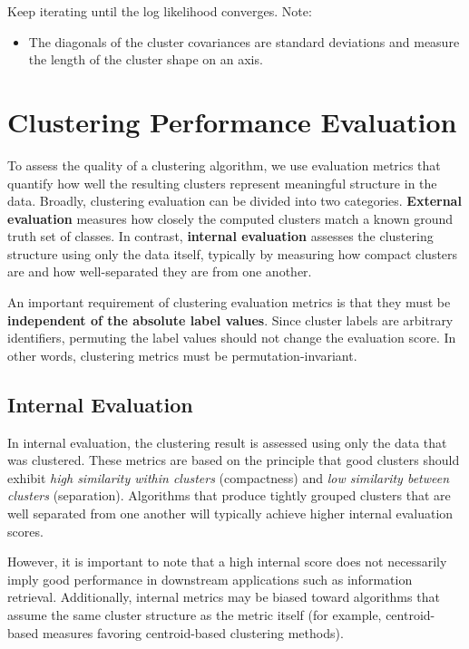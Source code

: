 \documentclass{article}
\begin{document}
Keep iterating until the log likelihood converges. Note:
\begin{itemize}
    \item The diagonals of the cluster covariances are standard deviations and measure the length of the cluster shape on an axis.
\end{itemize}

\section{Clustering Performance Evaluation}

To assess the quality of a clustering algorithm, we use evaluation metrics that quantify how well the resulting clusters represent meaningful structure in the data. Broadly, clustering evaluation can be divided into two categories. \textbf{External evaluation} measures how closely the computed clusters match a known ground truth set of classes. In contrast, \textbf{internal evaluation} assesses the clustering structure using only the data itself, typically by measuring how compact clusters are and how well-separated they are from one another.

An important requirement of clustering evaluation metrics is that they must be \textbf{independent of the absolute label values}. Since cluster labels are arbitrary identifiers, permuting the label values should not change the evaluation score. In other words, clustering metrics must be permutation-invariant.

\subsection{Internal Evaluation}

In internal evaluation, the clustering result is assessed using only the data that was clustered. These metrics are based on the principle that good clusters should exhibit \emph{high similarity within clusters} (compactness) and \emph{low similarity between clusters} (separation). Algorithms that produce tightly grouped clusters that are well separated from one another will typically achieve higher internal evaluation scores.

However, it is important to note that a high internal score does not necessarily imply good performance in downstream applications such as information retrieval. Additionally, internal metrics may be biased toward algorithms that assume the same cluster structure as the metric itself (for example, centroid-based measures favoring centroid-based clustering methods).
\end{document}
